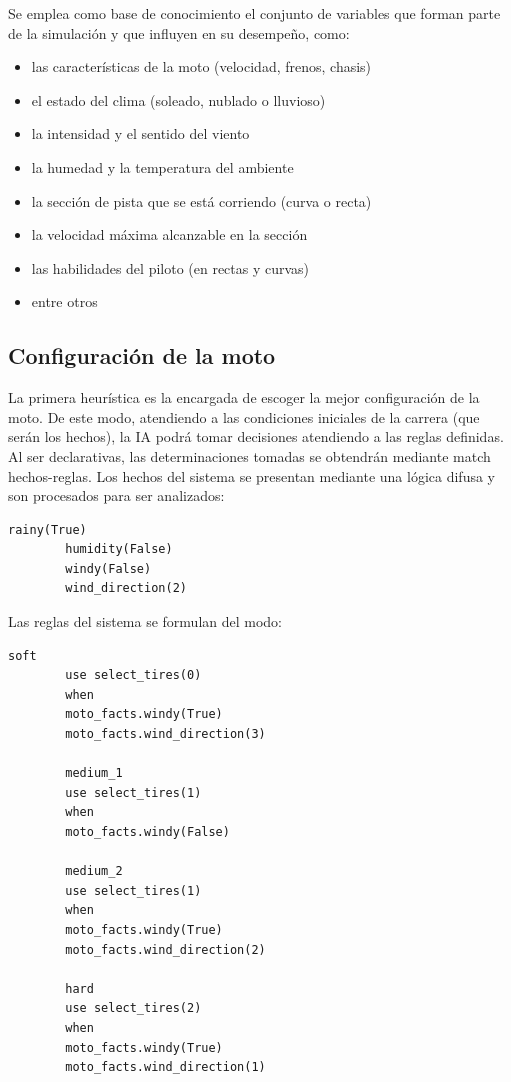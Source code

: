\documentclass[12pt, letterpaper,spanish]{article}
\theoremstyle{definition}
\theoremstyle{remark}
\begin{document}
	Se emplea como base de conocimiento el conjunto de variables que forman parte de la simulación y que influyen en su desempeño, como:
	\begin{itemize}
		\item las características de la moto (velocidad, frenos, chasis)
		\item el estado del clima (soleado, nublado o lluvioso)
		\item la intensidad y el sentido del viento
		\item la humedad y la temperatura del ambiente
		\item la sección de pista que se está corriendo (curva o recta)
		\item la velocidad máxima alcanzable en la sección
		\item las habilidades del piloto (en rectas y curvas)
		\item entre otros
	\end{itemize}
	
	\subsection{Configuración de la moto}
	La primera heurística es la encargada de escoger la mejor configuración de la moto. De este modo, atendiendo a las condiciones iniciales de la carrera (que serán los hechos), la IA podrá tomar decisiones atendiendo a las reglas definidas. Al ser declarativas, las determinaciones tomadas se obtendrán mediante match hechos-reglas.
	Los hechos del sistema se presentan mediante una lógica difusa y son procesados para ser analizados:
	\begin{lstlisting}[language={PySharp}, label={Script}]
		rainy(True)
		humidity(False)
		windy(False)
		wind_direction(2)
	\end{lstlisting}
	
	Las reglas del sistema se formulan del modo:
	\begin{lstlisting}[language={PySharp}, label={Script}]
		soft
		use select_tires(0)
		when
		moto_facts.windy(True)
		moto_facts.wind_direction(3)
		
		medium_1
		use select_tires(1)
		when
		moto_facts.windy(False)
		
		medium_2
		use select_tires(1)
		when
		moto_facts.windy(True)
		moto_facts.wind_direction(2)
		
		hard
		use select_tires(2)
		when
		moto_facts.windy(True)
		moto_facts.wind_direction(1)
	\end{lstlisting}
	
\end{document}
